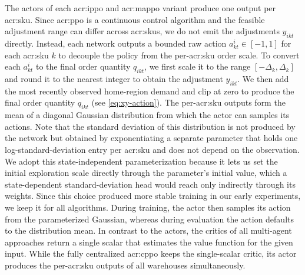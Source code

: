 The actors of each \gls{acr:ippo} and \gls{acr:mappo} variant produce one output per \gls{acr:sku}. Since \gls{acr:ppo} is a continuous control algorithm and the feasible adjustment range can differ across \glspl{acr:sku}, we do not emit the adjustments $y_{ikt}$ directly. Instead, each network outputs a bounded raw action $a^i_{kt} \in [-1,1]$ for each \gls{acr:sku} $k$ to decouple the policy from the per-\gls{acr:sku} order scale. To convert each $a^i_{kt}$ to the final order quantity $q_{ikt}$, we first scale it to the range $[-\Delta_k,\Delta_k]$ and round it to the nearest integer to obtain the adjustment $y_{ikt}$. We then add the most recently observed home-region demand and clip at zero to produce the final order quantity $q_{ikt}$ (see \autoref{eq:xy-action}). The per-\gls{acr:sku} outputs form the mean of a diagonal Gaussian distribution from which the actor can samples its actions. Note that the standard deviation of this distribution is not produced by the network but obtained by exponentiating a separate parameter that holds one log-standard-deviation entry per \gls{acr:sku} and does not depend on the observation. We adopt this state-independent parameterization because it lets us set the initial exploration scale directly through the parameter's initial value, which a state-dependent standard-deviation head would reach only indirectly through its weights. Since this choice produced more stable training in our early experiments, we keep it for all algorithms. During training, the actor then samples its action from the parameterized Gaussian, whereas during evaluation the action defaults to the distribution mean. In contrast to the actors, the critics of all multi-agent approaches return a single scalar that estimates the value function for the given input. While the fully centralized \gls{acr:cppo} keeps the single-scalar critic, its actor produces the per-\gls{acr:sku} outputs of all warehouses simultaneously.\\


